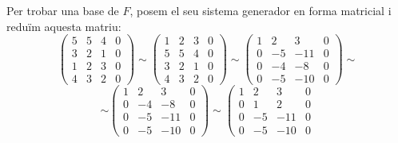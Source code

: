\documentclass[a4paper, 12pt]{article}
\begin{document}
    \begin{solucio}
        Per trobar una base de $F$, posem el seu sistema generador en forma matricial i reduïm aquesta
        matriu:
        \begin{displaymath}
            \left(
                \begin{array}{cccc}
                    5 & 5 & 4 & 0\\
                    3 & 2 & 1 & 0\\
                    1 & 2 & 3 & 0\\
                    4 & 3 & 2 & 0
                \end{array}
            \right)
            \sim
            \left(
                \begin{array}{cccc}
                    1 & 2 & 3 & 0\\
                    5 & 5 & 4 & 0\\
                    3 & 2 & 1 & 0\\
                    4 & 3 & 2 & 0
                \end{array}
            \right)
            \sim
            \left(
                \begin{array}{cccc}
                    1 & 2 & 3 & 0\\
                    0 & -5 & -11 & 0\\
                    0 & -4 & -8 & 0\\
                    0 & -5 & -10 & 0
                \end{array}
            \right)
            \sim
        \end{displaymath}
        \begin{displaymath}
            \sim
            \left(
                \begin{array}{cccc}
                    1 & 2 & 3 & 0\\
                    0 & -4 & -8 & 0\\
                    0 & -5 & -11 & 0\\
                    0 & -5 & -10 & 0
                \end{array}
            \right)
            \sim
            \left(
                \begin{array}{cccc}
                    1 & 2 & 3 & 0\\
                    0 & 1 & 2 & 0\\
                    0 & -5 & -11 & 0\\
                    0 & -5 & -10 & 0

\end{array}
\end{displaymath}
\end{solucio}
\end{document}
